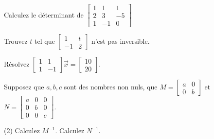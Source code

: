 \setcounter{exercise}{100}

\begin{exercise}
Calculez le déterminant de
$\left[ \begin{smallmatrix}
1 & 1 & 1 \\
2 & 3 & -5 \\
1 & -1 & 0
\end{smallmatrix}\right]$
\end{exercise}

\begin{exercise}
Trouvez $t$ tel que
$\left[ \begin{smallmatrix}
1 & t \\
-1 & 2
\end{smallmatrix}\right]$
n’est pas inversible.
\end{exercise}

\begin{exercise}
Résolvez
$\left[ \begin{smallmatrix}
1 & 1 \\
1 & -1
\end{smallmatrix}\right] \vec{x} = 
\left[ \begin{smallmatrix}
10 \\ 20
\end{smallmatrix}\right]$.
\end{exercise}

\begin{exercise}
Supposez que $a, b, c$ sont des nombres non nuls, que
$M=\left[ \begin{smallmatrix}
a & 0 \\
0 & b
\end{smallmatrix}\right]$ et
$N=\left[ \begin{smallmatrix}
a & 0 & 0 \\
0 & b & 0 \\
0 & 0 & c
\end{smallmatrix}\right]$.
\begin{tasks}(2)
\task Calculez $M^{-1}$.
\task Calculez $N^{-1}$.
\end{tasks}
\end{exercise}

